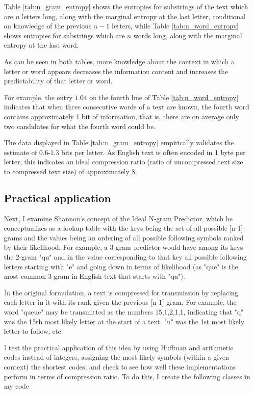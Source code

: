 Table \ref{tab:n_gram_entropy} shows the entropies for substrings of the text which are $n$ letters long, along with the marginal entropy at the last letter, conditional on knowledge of the previous $n-1$ letters, while Table \ref{tab:n_word_entropy} shows entropies for substrings which are $n$ words long, along with the marginal entropy at the last word.

As can be seen in both tables, more knowledge about the context in which a letter or word appears decreases the information content and increases the predictability of that letter or word.

For example, the entry $1.04$ on the fourth line of Table \ref{tab:n_word_entropy} indicates that when three consecutive words of a text are known, the fourth word contains approximately 1 bit of information, that is, there are on average only two candidates for what the fourth word could be.

The data displayed in Table \ref{tab:n_gram_entropy} empirically validates the estimate of 0.6-1.3 bits per letter. As English text is often encoded in 1 byte per letter, this indicates an ideal compression ratio (ratio of uncompressed text size to compressed text size) of approximately 8.


\subsection{Practical application}
\label{subsec:n_gram_practical}

Next, I examine Shannon's concept of the Ideal N-gram Predictor, which he conceptualizes as a lookup table with the keys being the set of all possible [n-1]-grams and the values being an ordering of all possible following symbols ranked by their likelihood. For example, a 3-gram predictor would have among its keys the 2-gram "qu" and in the value corresponding to that key all possible following letters starting with "e" and going down in terms of likelihood (as "que" is the most common 3-gram in English text that starts with "qu").

In the original formulation, a text is compressed for transmission by replacing each letter in it with its rank given the previous [n-1]-gram. For example, the word "queue" may be transmitted as the numbers 15,1,2,1,1, indicating that "q" was the 15th most likely letter at the start of a text, "u" was the 1st most likely letter to follow, etc.

I test the practical application of this idea by using Huffman and arithmetic codes instead of integers, assigning the most likely symbols (within a given context) the shortest codes, and check to see how well these implementations perform in terms of compression ratio. To do this, I create the following classes in my code

